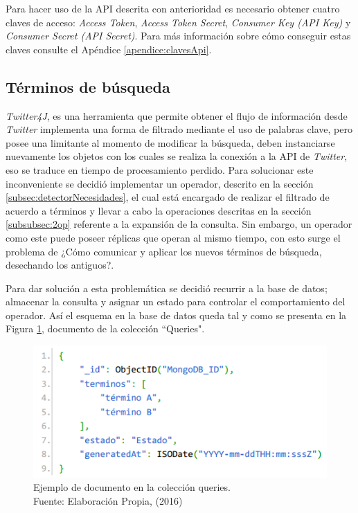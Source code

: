 Para hacer uso de la API descrita con anterioridad es necesario obtener cuatro claves de acceso: \textit{Access Token}, \textit{Access Token Secret}, \textit{Consumer Key (API Key)} y \textit{Consumer Secret (API Secret)}. Para más información sobre cómo conseguir estas claves consulte el Apéndice \ref{apendice:clavesApi}.

\subsection{Términos de búsqueda}
\label{sec:diseno:termBusqueda}

\textit{Twitter4J}, es una herramienta que permite obtener el flujo de información desde \textit{Twitter} implementa una forma de filtrado mediante el uso de palabras clave, pero posee una limitante al momento de modificar la búsqueda, deben instanciarse nuevamente los objetos con los cuales se realiza la conexión a la API de \textit{Twitter}, eso se traduce en tiempo de procesamiento perdido. Para solucionar este inconveniente se decidió implementar un operador, descrito en la sección \ref{subsec:detectorNecesidades}, el cual está encargado de realizar el filtrado de acuerdo a términos y llevar a cabo la operaciones descritas en la sección \ref{subsubsec:2op} referente a la expansión de la consulta. Sin embargo, un operador como este puede poseer réplicas que operan al mismo tiempo, con esto surge el problema de ¿Cómo comunicar y aplicar los nuevos términos de búsqueda, desechando los antiguos?.

Para dar solución a esta problemática se decidió recurrir a la base de datos; almacenar la consulta y asignar un estado para controlar el comportamiento del operador. Así el esquema en la base de datos queda tal y como se presenta en la Figura \ref{fig:esquemaQuery}, documento de la colección ``Queries".

\begin{figure}[H]
	\centering
	\captionsetup{justification=centering}
	\includegraphics[scale=0.8]{images/Query.png}
	\caption[Ejemplo de documento en la colección queries.]{Ejemplo de documento en la colección queries.\\Fuente: Elaboración Propia, (2016)}
	\label{fig:esquemaQuery}
\end{figure}

